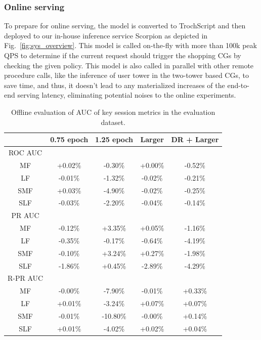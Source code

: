 \documentclass[sigconf, authorversion]{acmart}
\begin{document}
\subsubsection{Online serving} To prepare for online serving, the model is converted to TrochScript and then deployed to our in-house inference service Scorpion as depicted in Fig.~\ref{fig:sys_overview}. This model is called on-the-fly with more than 100k peak QPS to determine if the current request should trigger the shopping CGs by checking the given policy. This model is also called in parallel with other remote procedure calls, like the inference of user tower in the two-tower based CGs, to save time, and thus, it doesn't lead to any materialized increases of the end-to-end serving latency, eliminating potential noises to the online experiments.

\begin{table}[h]
  \caption{Offline evaluation of AUC of key session metrics in the evaluation dataset.}
  \label{tab:offline_eval}
  \begin{tabular}{ccccc}
    \toprule
     & 0.75 epoch & 1.25 epoch & Larger & DR + Larger  \\
    \hline \hline
    ROC AUC &  &  &  &  \\
    \hline
    MF & +0.02\% & -0.30\% & +0.00\% & -0.52\% \\
    LF & -0.01\% & -1.32\% & -0.02\% & -0.21\% \\
    SMF & +0.03\% & -4.90\% & -0.02\% & -0.25\% \\
    SLF & -0.03\% & -2.20\% & -0.04\% & -0.14\% \\
    \hline \hline
    PR AUC &  &  &  &  \\
    \hline
    MF & -0.12\% & +3.35\% & +0.05\% & -1.16\% \\
    LF & -0.35\% & -0.17\% & -0.64\% & -4.19\% \\
    SMF & -0.10\% & +3.24\% & +0.27\% & -1.98\% \\
    SLF & -1.86\% & +0.45\% & -2.89\% & -4.29\% \\
    \hline \hline
    R-PR AUC &  &  &  &  \\
    \hline
    MF & -0.00\% & -7.90\% & -0.01\% & +0.33\% \\
    LF & +0.01\% & -3.24\% & +0.07\% & +0.07\% \\
    SMF & -0.01\% & -10.80\% & -0.00\% & +0.14\% \\
    SLF & +0.01\% & -4.02\% & +0.02\% & +0.04\% \\
    \bottomrule
  \end{tabular}
\end{table}
\end{document}

